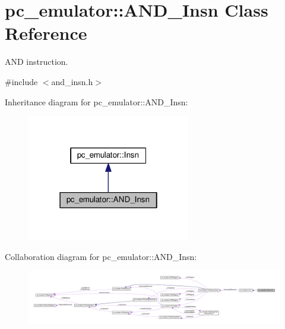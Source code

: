 \hypertarget{classpc__emulator_1_1AND__Insn}{}\section{pc\+\_\+emulator\+:\+:A\+N\+D\+\_\+\+Insn Class Reference}
\label{classpc__emulator_1_1AND__Insn}


A\+ND instruction.  




{\ttfamily \#include $<$and\+\_\+insn.\+h$>$}



Inheritance diagram for pc\+\_\+emulator\+:\+:A\+N\+D\+\_\+\+Insn\+:
\nopagebreak
\begin{figure}[H]
\begin{center}
\leavevmode
\includegraphics[width=202pt]{classpc__emulator_1_1AND__Insn__inherit__graph}
\end{center}
\end{figure}


Collaboration diagram for pc\+\_\+emulator\+:\+:A\+N\+D\+\_\+\+Insn\+:
\nopagebreak
\begin{figure}[H]
\begin{center}
\leavevmode
\includegraphics[width=350pt]{classpc__emulator_1_1AND__Insn__coll__graph}
\end{center}
\end{figure}
